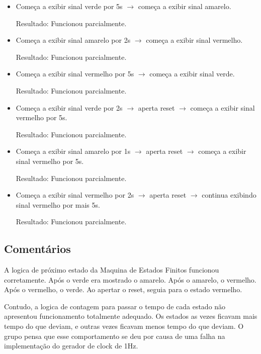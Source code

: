 \documentclass[12pt, a4paper]{article}
\begin{document}
	\begin{itemize}
		\item Começa a exibir sinal verde por 5s \( \rightarrow \) começa a exibir sinal amarelo.
		\par Resultado: Funcionou parcialmente.
		\item Começa a exibir sinal amarelo por 2s \( \rightarrow \) começa a exibir sinal vermelho.
		\par Resultado: Funcionou parcialmente.
		\item Começa a exibir sinal vermelho por 5s \( \rightarrow \) começa a exibir sinal verde.
		\par Resultado: Funcionou parcialmente.
		\item Começa a exibir sinal verde por 2s \( \rightarrow \) aperta reset \( \rightarrow \) começa a exibir sinal vermelho por 5s.
		\par Resultado: Funcionou parcialmente.
		\item Começa a exibir sinal amarelo por 1s \( \rightarrow \) aperta reset \( \rightarrow \) começa a exibir sinal vermelho por 5s.
		\par Resultado: Funcionou parcialmente.
		\item Começa a exibir sinal vermelho por 2s \( \rightarrow \) aperta reset \( \rightarrow \) continua exibindo sinal vermelho por mais 5s.
		\par Resultado: Funcionou parcialmente.
		
	\end{itemize}
	
	\subsection*{Comentários}
	
	A logica de próximo estado da Maquina de Estados Finitos funcionou corretamente. 
	Após o verde era mostrado o amarelo. Após o amarelo, o vermelho. Após o vermelho, o verde. 
	Ao apertar o reset, seguia para o estado vermelho.
	\par
	Contudo, a logica de contagem para passar o tempo de cada estado não apresentou funcionamento totalmente adequado.
	Os estados as vezes ficavam mais tempo do que deviam, e outras vezes ficavam menos tempo do que deviam.
	O grupo pensa que esse comportamento se deu por causa de uma falha na implementação do gerador de clock de 1Hz.

	
	
\end{document}
